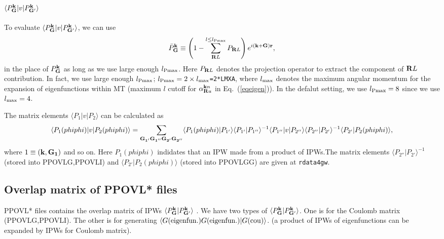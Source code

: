 \documentclass[a4paper,10pt,epsf,fleqn]{article}
\newcommand{\bfk}{{\bf k}}
\newcommand{\bfG}{{\bf G}}
\newcommand{\bfR}{{\bf R}}
\newcommand{\io}[1]{{\sf  #1}}
\newcommand{\req}[1]{\mbox{Eq.~(\ref{#1})}}
\begin{document}
\subsection{$\langle P^\bfk_\bfG |v| P^\bfk_{\bfG'} \rangle$}
To evaluate 
$\langle P^\bfk_\bfG |v| P^\bfk_{\bfG'} \rangle$, 
we can use 
\begin{eqnarray}
\bar{P}^{\bf k}_{{\bf G}} \equiv 
\left( 1- \sum_{\bfR{L}}^{l\le l_{\rm Pmax}} {P}_{\bfR{L}} \right) 
e^{i ({\bf k+ G}){\bf r}}, \label{eq:baripw}
\end{eqnarray}
in the place of ${P}^{\bf k}_{{\bf G}}$
as long as we use large enough $l_{\rm Pmax}$.
Here ${P}_{\bfR{L}}$ denotes the projection operator 
to extract the component of ${\bfR{L}}$ contribution.
In fact, we use large enough $l_{\rm Pmax}$;
$l_{\rm Pmax} = 2 \times l_{\rm max}$\verb!=2*LMXA!,
where $l_{\rm max}$ denotes the maximum angular momentum 
for the expansion of eigenfunctions within MT (maximum
$l$ cutoff for $\alpha^{{\bfk}n}_{\bfR u}$ in \req{eqeigen}). 
In the defalut setting, we use $l_{\rm Pmax}=8$ 
since we use $l_{\rm max}=4$. 



The matrix elements $\langle P_1 |v| P_2 \rangle$ 
can be calculated as
\begin{eqnarray}
\langle P_1(phiphi) |v| P_2(phiphi) \rangle=
\sum_{\bf G_{1'} G_{1''} G_{2'} G_{2''}} 
\langle P_1(phiphi) | {P_{1'}} \rangle  
\langle {P}_{1'}| {P}_{1''} \rangle^{-1} 
\langle {P}_{1''} |v| {P_{2''}} \rangle  
\langle {P}_{2''}| {P}_{2'} \rangle^{-1} 
\langle {P_{2'}} | P_2(phiphi) \rangle,  
\label{eq:pvp}
\end{eqnarray}
where $1\equiv ({\bf k},{\bf G_1})$ and so on.
Here $P_1(phiphi)$ indidates 
that an IPW made from a product
of IPWs.The matrix elements
$\langle {P}_{2''}| {P}_{2'} \rangle^{-1}$ 
(stored into \io{PPOVLG,PPOVLI})
and $\langle {P_{2'}} | P_2(phiphi) \rangle$ 
(stored into \io{PPOVLGG})
are given at {\tt rdata4gw}.


\subsection{Overlap matrix of PPOVL* files}
\io{PPOVL*} files contains the 
overlap matrix of IPWs 
$\langle {P}^{\bf k}_{{\bf G}}|{P}^{\bf k}_{{\bf G'}}\rangle$
.
We have two types of $\langle {P}^{\bf k}_{{\bf G}}|{P}^{\bf k}_{{\bf G'}}\rangle$.
One is for the Coulomb matrix (PPOVLG,PPOVLI).
The other is for generating 
$\langle G({\rm eigenfun.}) G({\rm eigenfun.})| G({\rm cou}) \rangle$.  
(a product of IPWs of eigenfunctions can be
expanded by IPWs for Coulomb matrix).
\end{document}
